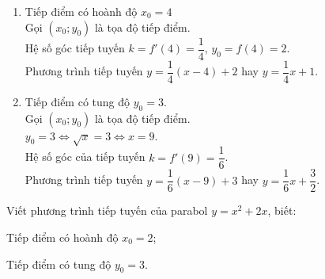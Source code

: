 \begin{bt}
\begin{vd}
{	\begin{enumerate}
	\item Tiếp điểm có hoành độ $x_0=4$\\
	Gọi $(x_0;y_0)$ là tọa độ tiếp điểm.\\
	Hệ số góc tiếp tuyến $k=f'(4)=\dfrac{1}{4}$, 
	$y_0=f(4)=2$.\\
	Phương trình tiếp tuyến $y=\dfrac{1}{4}(x-4)+2$ hay $y=\dfrac{1}{4}x+1$.
	\item Tiếp điểm có tung độ $y_0=3$.\\
	Gọi $(x_0;y_0)$ là tọa độ tiếp điểm.\\
	$y_0=3\Leftrightarrow \sqrt{x}=3\Leftrightarrow x=9$.\\
	Hệ số góc của tiếp tuyến $k=f'(9)=\dfrac{1}{6}$.\\
	Phương trình tiếp tuyến $y=\dfrac{1}{6}(x-9)+3$ hay $y=\dfrac{1}{6}x+\dfrac{3}{2}$.
	\end{enumerate}	
	}
\end{vd}
\begin{vd}%
	Viết phương trình tiếp tuyến của parabol $y=x^2+2x$, biết:
	\begin{listEX}[2]
	\item Tiếp điểm có hoành độ $x_0=2$;
	\item Tiếp điểm có tung độ $y_0=3$.
	\end{listEX}	
\end{vd}

\end{bt}
